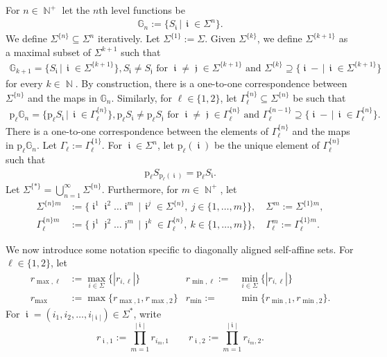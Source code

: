 \documentclass[a4paper, 11pt]{article}
\DeclareMathOperator{\N}{\mathbb{N}}
\DeclareMathOperator{\iii}{\mathfrak{i}}
\DeclareMathOperator{\jjj}{\mathfrak{j}}
\numberwithin{equation}{section}
\theoremstyle{plain}
\theoremstyle{remark}
\theoremstyle{definition}
\begin{document}
For $n \in \N^+$ let the $n$th level functions be
\begin{align*}
\mathbb{G}_n := \big\{ S_{\iii} \, \big|\, \iii \in \Sigma^n \big\}.
\end{align*}
We define $\Sigma^{\{n\}} \subseteq \Sigma^n$ iteratively. Let $\Sigma^{\{1\}}:=\Sigma$. Given $\Sigma^{\{k\}}$, we define $\Sigma^{\{k+1\}}$ as a maximal subset of $\Sigma^{k+1}$ such that
\begin{align*}
\mathbb{G}_{k+1}=\Big\{S_{\iii}\, \Big|\, \iii\in\Sigma^{\{k+1\}}\Big\}, S_{\iii}\neq S_{\jjj}\text{ for $\iii\neq\jjj\in\Sigma^{\{k+1\}}$ and }\Sigma^{\{k\}} \supseteq \Big\{ \iii- \, \Big|\, \iii \in \Sigma^{\{k+1\}} \Big\}
\end{align*}
for every $k\in\N$.
By construction, there is a one-to-one correspondence between $\Sigma^{\{n\}}$ and the maps in $\mathbb{G}_n$. Similarly, for $\ell\in\{1,2\}$, let $\Gamma_\ell^{\{n\}}\subseteq\Sigma^{\{n\}}$ be such that
\begin{align*}
\mathrm{p}_\ell\mathbb{G}_{n}=\Big\{\mathrm{p}_\ell S_{\iii}\, \Big|\, \iii\in\Gamma_\ell^{\{n\}}\Big\}, \mathrm{p}_\ell S_{\iii}\neq \mathrm{p}_\ell S_{\jjj}\text{ for $\iii\neq\jjj\in\Gamma_\ell^{\{n\}}$} \text{ and }\Gamma_\ell^{\{n-1\}} \supseteq \Big\{ \iii- \, \Big|\, \iii \in \Gamma_\ell^{\{n\}} \Big\}.
\end{align*}
There is a one-to-one correspondence between the elements of $\Gamma_\ell^{\{n\}}$ and the maps in $\mathrm{p}_\ell\mathbb{G}_n$. Let $\Gamma_\ell := \Gamma_\ell^{\{1\}}$. For $\iii \in \Sigma^n$, let $\mathrm{p}_\ell (\iii)$ be the unique element of $\Gamma_\ell^{\{n\}}$ such that
\begin{align*}
\mathrm{p}_\ell S_{\mathrm{p}_\ell (\iii)} = \mathrm{p}_\ell S_{\iii}.
\end{align*}
Let $\Sigma^{\{*\}}=\bigcup_{n=1}^\infty\Sigma^{\{n\}}$. Furthermore, for $m \in \N^+$, let
\begin{align*}
\Sigma^{\{n\}m} &:= \Big\{ \iii^1\iii^2 \dots \iii^m \, \Big|\, \iii^j \in \Sigma^{\{n\}},\ j \in \{1,\dots,m\} \Big\}, \quad \Sigma^m := \Sigma^{\{1\}m}, \\
\Gamma_\ell^{\{n\}m} &:=\Big\{\jjj^1\jjj^2\dots \jjj^m \, \Big| \, \jjj^k\in\Gamma_\ell^{\{n\}},\ k \in \{1,\dots,m\}\Big\}, \quad \Gamma_\ell^m := \Gamma_\ell^{\{1\}m}.
\end{align*}

We now introduce some notation specific to diagonally aligned self-affine sets. For $\ell\in\{1,2\}$, let
\begin{align*}
r_{\max,\ell} &:= \max_{i \in \Sigma} \big\{ |r_{i,\ell}| \big\} &  r_{\min,\ell} := &\min_{i \in \Sigma} \big\{ |r_{i,\ell}| \big\}\\
r_{\max} &:= \max\big\{ r_{\max,1},r_{\max,2} \big\} & r_{\min} := &\min\big\{r_{\min,1},r_{\min,2} \big\}.
\end{align*}
For
$\iii = (i_1,i_2,\dots, i_{|\iii|}) \in \Sigma^*$, write
\[ r_{\iii,1}:= \prod_{m=1}^{|\iii|} r_{i_{m},1}\quad \quad r_{\iii,2}:= \prod_{m=1}^{|\iii|} r_{i_{m},2}.\]
\end{document}
